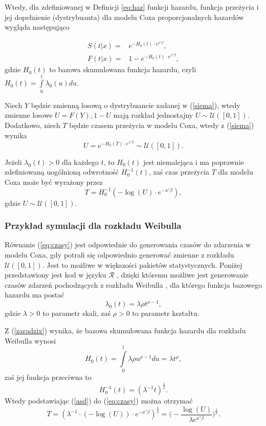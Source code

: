 Wtedy, dla zdefiniowanej w Definicji \ref{eq:haz} funkcji hazardu, funkcja przeżycia i jej dopełnienie (dystrybuanta) dla modelu Coxa proporcjonalnych hazardów wygląda następująco

\begin{align}
S(t|x)= & e^{-H_0(t)\cdot e^{x'\beta}}, \\ 
F(t|x) = & 1 - e^{-H_0(t)\cdot e^{x'\beta}},\label{siema}
\end{align}
gdzie $H_0(t)$ to bazowa skumulowana funkcja hazardu, czyli $H_0(t) = \int\limits_{0}^{t}\lambda_0(u) du$.

Niech $Y$ będzie zmienną losową o dystrybuancie zadanej w (\ref{siema}), wtedy zmienne losowe $U=F(Y), 1-U$ mają rozkład jednostajny $U \sim \mathcal{U}([0,1])$. Dodatkowo, niech $T$ będzie czasem przeżycia w modelu Coxa, wtedy z (\ref{siema}) wynika
\begin{equation}
U = e^{-H_0(T)\cdot e^{x'\beta}} \sim \mathcal{U}([0,1]).
\end{equation}

Jeżeli $\lambda_0(t) >0$ dla każdego $t$, to $H_0(t)$ jest niemalejąca i ma poprawnie zdefiniowaną uogólnioną odwrotność $H_0^{-1}(t)$, zaś czas przeżycia $T$ dla modelu Coxa może być wyrażony przez 
\begin{equation}\label{eq:czasy}
T = H_0^{-1}(-\log(U)\cdot e^{-x'\beta}),
\end{equation}
gdzie  $U \sim \mathcal{U}([0,1])$.

\subsubsection{Przykład symulacji dla rozkładu Weibulla}\label{symWei}

Równanie (\ref{eq:czasy})  jest odpowiednie do generowania czasów do zdarzenia w modelu Coxa, gdy potrafi się odpowiednio generować zmienne z rozkładu $\mathcal{U}([0,1])$. Jest to możliwe w większości pakietów statystycznych. Poniżej przedstawiony jest kod w języku $\mathcal{R}$ \cite{programikr}, dzięki któremu możliwe jest generowanie czasów zdarzeń pochodzących z rozkładu Weibulla \cite{collett}, dla którego funkcja bazowego hazardu ma postać
\begin{equation}
\lambda_0(t)=\lambda\rho t^{\rho-1},
\end{equation}
gdzie $\lambda>0$ to parametr skali, zaś $\rho > 0$ to parametr kształtu.

\newpage

Z (\ref{zaradzix}) wynika, że bazowa skumulowana funkcja hazardu dla rozkładu Weibulla wynosi
\begin{equation}
H_0(t) = \int\limits_{0}^{t} \lambda\rho u^{\rho-1} du = \lambda t^{\rho},
\end{equation}
zaś jej funkcja przeciwna to
\begin{equation}\label{asd}
H_0^{-1}(t)= (\lambda^{-1}t)^{\frac{1}{\rho}}.
\end{equation}
Wtedy podstawiając (\ref{asd}) do (\ref{eq:czasy}) można otrzymać
\begin{equation}
T = (\lambda^{-1}\cdot(-\log(U))\cdot e^{-x'\beta})^{\frac{1}{\rho}} = \Big(-\frac{\log(U)}{\lambda e^{x'\beta}}\Big)^{\frac{1}{\rho}}.
\end{equation}


